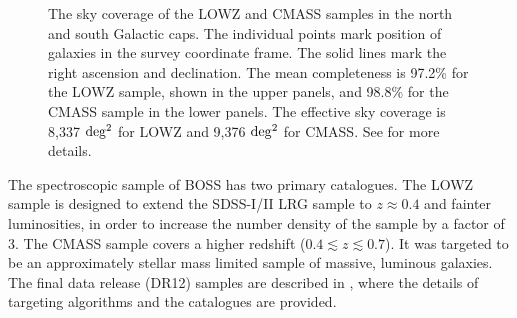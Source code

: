 \documentclass[iop]{emulateapj}
\begin{document}
\begin{figure}
   \caption{\label{fig_radec}
   The sky coverage of the LOWZ and CMASS samples in the north and south Galactic caps. 
   The individual points mark position of galaxies in the survey coordinate frame.
   The solid lines mark the right ascension and declination.
   The mean completeness is 97.2\% for the LOWZ sample, shown in the upper panels,
   and 98.8\% for the CMASS sample in the lower panels.
   The effective sky coverage is 8,337 $\rm deg^2$ for LOWZ and 9,376 $\rm deg^2$ for CMASS.
   See \cite{Reidetal:2016} for more details.
   }
\end{figure}

The spectroscopic sample of BOSS has two primary catalogues.
The LOWZ sample is designed to extend the SDSS-I/II LRG sample to $z\approx 0.4$ and fainter luminosities,
in order to increase the number density of the sample by a factor of 3.
The CMASS sample covers a higher redshift ($0.4\lesssim z \lesssim 0.7$).
It was targeted to be an approximately stellar mass limited sample of massive, luminous galaxies.
The final data release (DR12) samples are described in \cite{Reidetal:2016},
where the details of targeting algorithms and the catalogues are provided.


\end{document}

